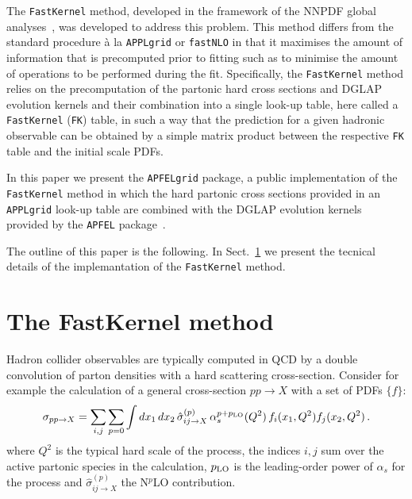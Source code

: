 \documentclass[preprint,12pt]{elsarticle}
\begin{document}
The {\tt FastKernel} method, developed in the framework of
the NNPDF global analyses~\cite{Ball:2010de}, was developed to address
this problem. This method differs from the standard procedure \`{a} la {\tt APPLgrid} or {\tt fastNLO} in that it
maximises the amount of information that is precomputed prior to fitting such as to minimise the amount
of operations to be performed during the fit. Specifically, the {\tt FastKernel} method relies on the precomputation
of the partonic hard cross sections and DGLAP evolution kernels
and their combination into a single look-up table, here called a {\tt FastKernel} ({\tt FK}) table, in such a way that the prediction for a given hadronic
observable can be obtained by a simple matrix product between
the respective {\tt FK} table and the initial scale PDFs.

In this paper we present the {\tt APFELgrid} package, a public implementation of the {\tt
  FastKernel} method in which the hard partonic cross sections provided in an {\tt APPLgrid} look-up table are combined with the DGLAP
evolution kernels provided by the {\tt APFEL}
package~\cite{Bertone:2013vaa}.

The outline of this paper is the following. In
Sect.~\ref{sec:FastKernel} we present the tecnical details of the
implemantation of the {\tt FastKernel} method.

\section{The FastKernel method}\label{sec:FastKernel}

Hadron collider observables are typically computed in QCD by a double
convolution of parton densities with a hard scattering cross-section. Consider for example the calculation of a general cross-section $pp\to X$ with a set of PDFs $\{f\}$:
\begin{equation}\label{eq:pertexp}
  \sigma_{pp\to X} =
  \sum_{i,j}\sum_{p=0} \int dx_1\,dx_2\,
  \hat{\sigma}^{(p)}_{ij\to X}\,\alpha_s^{p+p_{\rm LO}}(Q^2) \,f_i(x_1,Q^2) f_j(x_2,Q^2)\,.
\end{equation}
where $Q^2$ is the typical hard scale of the process, the indices
$i,j$ sum over the active partonic species in the calculation, $p_{\rm LO}$ is the leading-order power of $\alpha_s$ for the process
and $\hat{\sigma}^{(p)}_{ij\to X}$ the N$^p$LO contribution.
\end{document}
